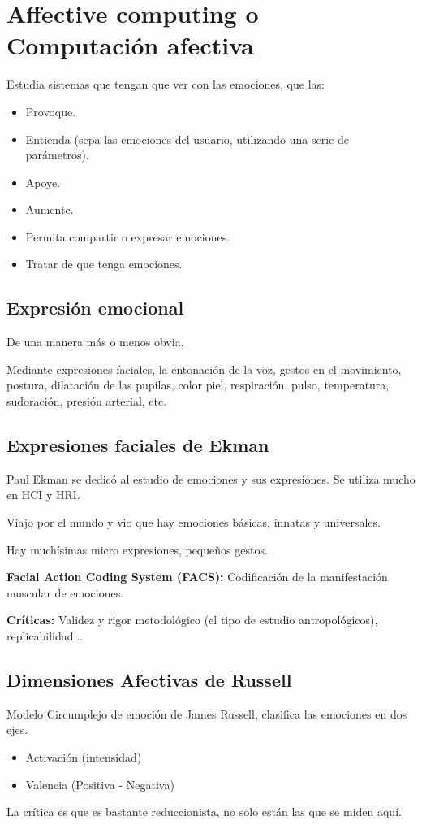 \documentclass[12pt, twoside, openright]{report} %
\begin{document}
\section{Affective computing o Computación afectiva}
Estudia sistemas que tengan que ver con las emociones, que las:
\begin{itemize}
	\item Provoque.
	\item Entienda (sepa las emociones del usuario, utilizando una serie de parámetros).
	\item Apoye.
	\item Aumente.
	\item Permita compartir o expresar emociones.
	\item Tratar de que tenga emociones.
\end{itemize}

\subsection{Expresión emocional}
De una manera más o menos obvia.

Mediante expresiones faciales, la entonación de la voz, gestos en el movimiento, postura, dilatación de las pupilas, color piel, respiración, pulso, temperatura, sudoración, presión arterial, etc.

\subsection{Expresiones faciales de Ekman}
Paul Ekman se dedicó al estudio de emociones y sus expresiones. Se utiliza mucho en HCI y HRI.

Viajo por el mundo y vio que hay emociones básicas, innatas y universales.

Hay muchísimas micro expresiones, pequeños gestos.

\textbf{Facial Action Coding System (FACS):} Codificación de la manifestación muscular de emociones.

\textbf{Críticas:} Validez y rigor metodológico (el tipo de estudio antropológicos), replicabilidad...

\subsection{Dimensiones Afectivas de Russell}
Modelo Circumplejo de emoción de James Russell, clasifica las emociones en dos ejes.
\begin{itemize}
	\item Activación (intensidad)
	\item Valencia (Positiva - Negativa)
\end{itemize}
La crítica es que es bastante reduccionista, no solo están las que se miden aquí.
\end{document}
